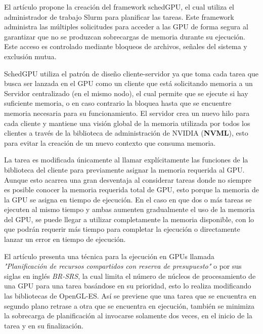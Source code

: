 
El artículo \cite{IntraNode} propone la creación del framework schedGPU, el cual utiliza el administrador de trabajo Slurm para planificar las tareas. Este framework administra las múltiples solicitudes para acceder a las GPU de forma segura al garantizar que no se produzcan sobrecargas de memoria durante su ejecución. Este acceso es controlado mediante bloqueos de archivos, señales del sistema y exclusión mutua.

SchedGPU utiliza el patrón de diseño cliente-servidor ya que toma cada tarea que busca ser lanzada en el GPU como un cliente que está solicitando memoria a un Servidor centralizado (en el mismo nodo), el cual permite que se ejecute si hay suficiente memoria, o en caso contrario la bloquea hasta que se encuentre memoria necesaria para su funcionamiento. El servidor crea un nuevo hilo para cada cliente y mantiene una visión global de la memoria utilizada por todos los clientes a través de la biblioteca de administración de NVIDIA (\textbf{NVML}), esto para evitar la creación de un nuevo contexto que consuma memoria.

\vspace{0.3cm}

La tarea es modificada únicamente al llamar explícitamente las funciones de la biblioteca del cliente para previamente asignar la memoria requerida al GPU. Aunque esto acarrea una gran desventaja al considerar tareas donde no siempre es posible conocer la memoria requerida total de GPU, esto porque la memoria de la GPU se asigna en tiempo de ejecución. En el caso en que dos o más tareas se ejecuten al mismo tiempo y ambas aumenten gradualmente el uso de la memoria del GPU, se puede llegar a utilizar completamente la memoria disponible, con lo que podrán requerir más tiempo para completar la ejecución o directamente lanzar un error en tiempo de ejecución.
	
	
	El artículo \cite{Pridriven} presenta una técnica para la ejecución en GPUs llamada \textit{"Planificación de recursos compartidos con reserva de presupuesto"} o por sus siglas en inglés \textit{BR-SRS}, la cual limita el número de núcleos de procesamiento de una GPU para una tarea basándose en su prioridad, esto lo realiza modificando las bibliotecas de OpenGL-ES. Así se previene que una tarea que se encuentra en segundo plano retrase a otra que se encuentra en ejecución, también se minimiza la sobrecarga de planificación al invocarse solamente dos veces, en el inicio de la tarea y en su finalización.

